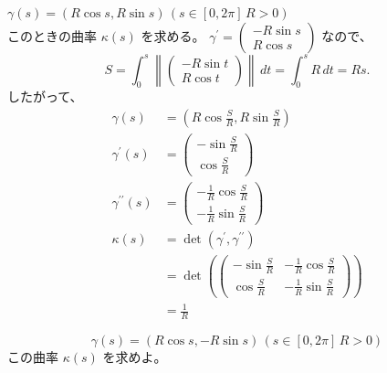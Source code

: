 \documentclass[article,paper=a4paper]{jlreq}
\begin{document}
\begin{ex}
    \quad $\gamma(s) = (R\cos s, R\sin s) \, (s \in [0, 2\pi]\, R > 0)$\\
    このときの曲率 $\kappa(s)$ を求める。
    $\gamma^{\prime} = \begin{pmatrix}
        -R\sin s \\ 
        R\cos s
    \end{pmatrix}$ なので、
    \[S = \int_{0}^{s}\left\|\begin{pmatrix}
        -R\sin t\\
        R\cos t
    \end{pmatrix}\right\|\,dt = \int_{0}^{s} R \, dt = Rs.\]
    したがって、
    \begin{align*}
        \gamma(s) &= \left(R\cos\frac{S}{R}, R\sin\frac{S}{R}\right)\\
        \gamma^{\prime}(s) &= \begin{pmatrix}
        -\sin\frac{S}{R} \\
        \cos\frac{S}{R}
        \end{pmatrix}\\
        \gamma^{\prime\prime}(s) &= \begin{pmatrix}
        -\frac{1}{R}\cos\frac{S}{R} \\
        -\frac{1}{R}\sin\frac{S}{R}
        \end{pmatrix}\\
        \kappa(s) &= \det(\gamma^{\prime}, \gamma^{\prime\prime}) \\
        &= \det\left(\begin{pmatrix}
        -\sin\frac{S}{R} &  -\frac{1}{R}\cos\frac{S}{R}\\
        \cos\frac{S}{R} & -\frac{1}{R}\sin\frac{S}{R}
        \end{pmatrix}\right) \\
        &= \frac{1}{R}
    \end{align*}
\end{ex}

\begin{prob}
    \[\gamma(s) = (R\cos s, -R\sin s) \, (s \in [0, 2\pi]\, R > 0)\]
    この曲率 $\kappa(s)$ を求めよ。
\end{prob}
\end{document}
